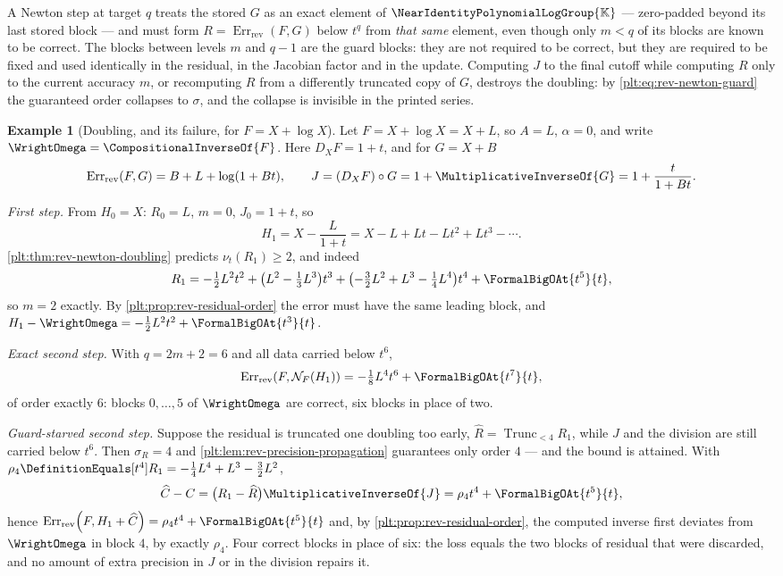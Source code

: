 \documentclass[11pt,oneside]{article}
\theoremstyle{plain}
\theoremstyle{definition}
\newtheorem{example}[theorem]{Example}
\theoremstyle{remark}
\newcommand{\K}{\mathbb{K}}
\newcommand{\Gnear}{\NearIdentityPolynomialLogGroup{\K}} %
\newcommand{\ordt}{\nu_{t}}                              %
\newcommand{\Trunc}[2]{\operatorname{Trunc}_{<#2}#1}     %
\newcommand{\DX}{D_{X}}                                  %
\newcommand{\compose}{\mathbin{\circ}}
\newcommand{\rev}[1]{\CompositionalInverseOf{#1}}
\newcommand{\RevErr}[2]{\operatorname{Err}_{\mathrm{rev}}\!\left(#1,#2\right)}
\begin{document}
\begin{warningbox}
A Newton step at target \(q\) treats the stored \(G\) as an exact element of
\(\Gnear\) --- zero-padded beyond its last stored block --- and must form
\(R=\RevErr{F}{G}\) below \(t^{q}\) from \emph{that same} element, even though
only \(m<q\) of its blocks are known to be correct.  The blocks between levels
\(m\) and \(q-1\) are the guard blocks: they are not required to be correct,
but they are required to be fixed and used identically in the residual, in the
Jacobian factor and in the update.  Computing \(J\) to the final cutoff while
computing \(R\) only to the current accuracy \(m\), or recomputing \(R\) from a
differently truncated copy of \(G\), destroys the doubling: by
\eqref{plt:eq:rev-newton-guard} the guaranteed order collapses to \(\sigma\),
and the collapse is invisible in the printed series.
\end{warningbox}

\begin{example}[Doubling, and its failure, for \(F=X+\log X\)]
\label{plt:ex:rev-guard}
Let \(F=X+\log X=X+L\), so \(A=L\), \(\alpha=0\), and write
\(\WrightOmega=\rev{F}\).  Here \(\DX F=1+t\), and for \(G=X+B\)
\[
 \RevErr{F}{G}=B+L+\log(1+Bt),
 \qquad
 J=(\DX F)\compose G=1+\MultiplicativeInverseOf{G}
  =1+\frac{t}{1+Bt}.
\]

\emph{First step.}  From \(H_0=X\): \(R_0=L\), \(m=0\),
\(J_0=1+t\), so
\[
 H_1=X-\frac{L}{1+t}=X-L+Lt-Lt^2+Lt^3-\cdots .
\]
\cref{plt:thm:rev-newton-doubling} predicts \(\ordt(R_1)\ge2\), and indeed
\[
 R_1=-\tfrac12L^2t^2
 +\bigl(L^2-\tfrac13L^3\bigr)t^3
 +\bigl(-\tfrac32L^2+L^3-\tfrac14L^4\bigr)t^4
 +\FormalBigOAt{t^{5}}{t},
\]
so \(m=2\) exactly.  By \cref{plt:prop:rev-residual-order} the error must have
the same leading block, and
\(H_1-\WrightOmega=-\tfrac12L^2t^2+\FormalBigOAt{t^{3}}{t}\).

\emph{Exact second step.}  With \(q=2m+2=6\) and all data carried below
\(t^{6}\),
\[
 \RevErr{F}{\mathcal N_F(H_1)}=-\tfrac18L^4t^6+\FormalBigOAt{t^{7}}{t},
\]
of order exactly \(6\): blocks \(0,\dots,5\) of \(\WrightOmega\) are correct,
six blocks in place of two.

\emph{Guard-starved second step.}  Suppose the residual is truncated one
doubling too early, \(\widehat R=\Trunc{R_1}{4}\), while \(J\) and the
division are still carried below \(t^{6}\).  Then \(\sigma_R=4\) and
\cref{plt:lem:rev-precision-propagation} guarantees only order \(4\) --- and
the bound is attained.  With
\(\rho_4\DefinitionEquals[t^4]R_1=-\tfrac14L^4+L^3-\tfrac32L^2\),
\[
 \widehat C-C=\bigl(R_1-\widehat R\bigr)\MultiplicativeInverseOf{J}
 =\rho_4t^4+\FormalBigOAt{t^{5}}{t},
\]
hence \(\RevErr{F}{H_1+\widehat C}=\rho_4t^4+\FormalBigOAt{t^{5}}{t}\) and,
by \cref{plt:prop:rev-residual-order}, the computed inverse first deviates from
\(\WrightOmega\) in block \(4\), by exactly \(\rho_4\).  Four correct blocks in
place of six: the loss equals the two blocks of residual that were discarded,
and no amount of extra precision in \(J\) or in the division repairs it.
\end{example}
\end{document}
